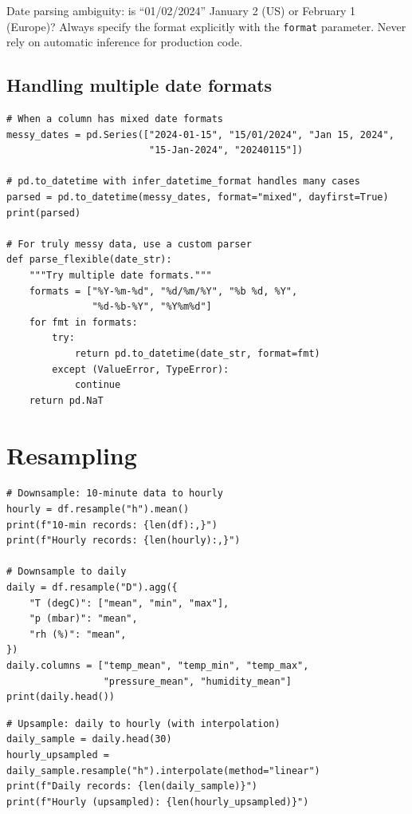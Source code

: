 \begin{warningbox}
Date parsing ambiguity: is ``01/02/2024'' January 2 (US) or February 1 (Europe)? Always specify the format explicitly with the \texttt{format} parameter. Never rely on automatic inference for production code.
\end{warningbox}

\subsection{Handling multiple date formats}

\begin{verbatim}
# When a column has mixed date formats
messy_dates = pd.Series(["2024-01-15", "15/01/2024", "Jan 15, 2024",
                         "15-Jan-2024", "20240115"])

# pd.to_datetime with infer_datetime_format handles many cases
parsed = pd.to_datetime(messy_dates, format="mixed", dayfirst=True)
print(parsed)

# For truly messy data, use a custom parser
def parse_flexible(date_str):
    """Try multiple date formats."""
    formats = ["%Y-%m-%d", "%d/%m/%Y", "%b %d, %Y",
               "%d-%b-%Y", "%Y%m%d"]
    for fmt in formats:
        try:
            return pd.to_datetime(date_str, format=fmt)
        except (ValueError, TypeError):
            continue
    return pd.NaT
\end{verbatim}

\section{Resampling}

\begin{verbatim}
# Downsample: 10-minute data to hourly
hourly = df.resample("h").mean()
print(f"10-min records: {len(df):,}")
print(f"Hourly records: {len(hourly):,}")

# Downsample to daily
daily = df.resample("D").agg({
    "T (degC)": ["mean", "min", "max"],
    "p (mbar)": "mean",
    "rh (%)": "mean",
})
daily.columns = ["temp_mean", "temp_min", "temp_max",
                 "pressure_mean", "humidity_mean"]
print(daily.head())
\end{verbatim}

\begin{verbatim}
# Upsample: daily to hourly (with interpolation)
daily_sample = daily.head(30)
hourly_upsampled = daily_sample.resample("h").interpolate(method="linear")
print(f"Daily records: {len(daily_sample)}")
print(f"Hourly (upsampled): {len(hourly_upsampled)}")
\end{verbatim}

